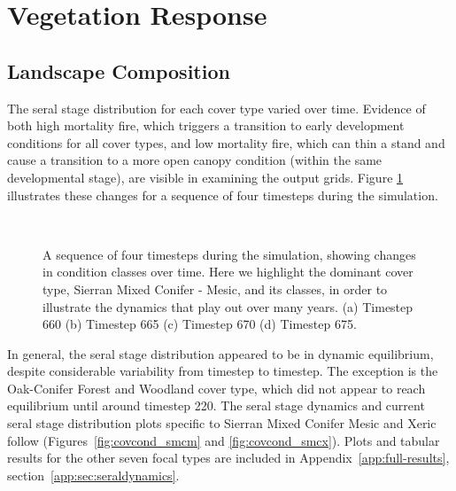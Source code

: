 \clearpage



\section{Vegetation Response}
\label{subsec:HRVvegresponse}

\subsection{Landscape Composition} 


The seral stage distribution for each cover type varied over time. Evidence of both high mortality fire, which triggers a transition to early development conditions for all cover types, and low mortality fire, which can thin a stand and cause a transition to a more open canopy condition (within the same developmental stage), are visible in examining the output grids. Figure \ref{fig:covcondmaps} illustrates these changes for a sequence of four timesteps during the simulation.

\begin{figure}[!htbp]
  \centering
  \\%
  \caption{A sequence of four timesteps during the simulation, showing changes in condition classes over time. Here we highlight the dominant cover type, Sierran Mixed Conifer - Mesic, and its classes, in order to illustrate the dynamics that play out over many years. (a) Timestep 660 (b) Timestep 665 (c) Timestep 670 (d) Timestep 675.}
  \label{fig:covcondmaps}
\end{figure}

In general, the seral stage distribution appeared to be in dynamic equilibrium, despite considerable variability from timestep to timestep. The exception is the Oak-Conifer Forest and Woodland cover type, which did not appear to reach equilibrium until around timestep 220. The seral stage dynamics and current seral stage distribution plots specific to Sierran Mixed Conifer Mesic and Xeric follow (Figures~\ref{fig:covcond_smcm} and \ref{fig:covcond_smcx}). Plots and tabular results for the other seven focal types are included in Appendix~\ref{app:full-results}, section~\ref{app:sec:seraldynamics}.

